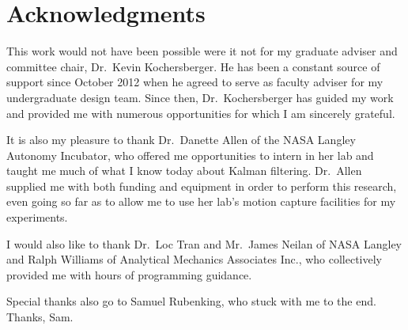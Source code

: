 \chapter*{Acknowledgments}

This work would not have been possible were it not for my graduate adviser and committee chair, Dr.~Kevin Kochersberger. He has been a constant source of support since October 2012 when he agreed to serve as faculty adviser for my undergraduate design team. Since then, Dr.~Kochersberger has guided my work and provided me with numerous opportunities for which I am sincerely grateful.

It is also my pleasure to thank Dr.~Danette Allen of the NASA Langley Autonomy Incubator, who offered me opportunities to intern in her lab and taught me much of what I know today about Kalman filtering. Dr.~Allen supplied me with both funding and equipment in order to perform this research, even going so far as to allow me to use her lab's motion capture facilities for my experiments.

I would also like to thank Dr.~Loc Tran and Mr.~James Neilan of NASA Langley and Ralph Williams of Analytical Mechanics Associates Inc., who collectively provided me with hours of programming guidance. 

Special thanks also go to Samuel Rubenking, who stuck with me to the end. Thanks, Sam.